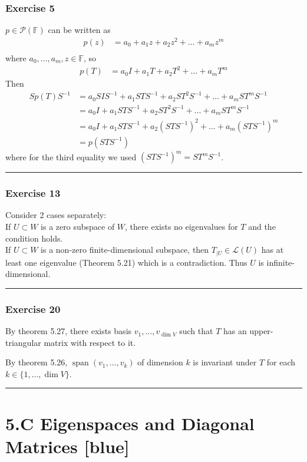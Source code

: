 \documentclass[12pt, letterpaper]{scrartcl}
\newcommand{\F}{\mathbb{F}}
\DeclareMathOperator{\Span}{span}
\begin{document}
\subsubsection*{Exercise 5}
$p\in\mathcal{P}(\F)$ can be written as
\begin{align*}
    p(z)&=a_0+a_1z+a_2z^2+\dots+a_mz^m\\
\end{align*}
where $a_0,\dots,a_m, z\in\F$, so
\begin{align*}
    p(T)&=a_0I+a_1T+a_2T^2+\dots+a_mT^m
\end{align*}
Then
\begin{align*}
    Sp(T)S^{-1}&=a_0SIS^{-1}+a_1STS^{-1}+a_2ST^2S^{-1}+\dots+a_mST^mS^{-1}\\
    &=a_0I+a_1STS^{-1}+a_2ST^2S^{-1}+\dots+a_mST^mS^{-1}\\
    &=a_0I+a_1STS^{-1}+a_2(STS^{-1})^2+\dots+a_m(STS^{-1})^m\\
    &=p(STS^{-1})
\end{align*}
where for the third equality we used $(STS^{-1})^m=ST^mS^{-1}$.
\vskip1mm\hrule


\subsubsection*{Exercise 13}
Consider 2 cases separately:\\
If $U\subset W$ is a zero subspace of $W$, there exists no eigenvalues for $T$ and the condition holds.\\
If $U\subset W$ is a non-zero finite-dimensional subspace, then $T_{|U}\in \mathcal{L}(U)$ has at least one eigenvalue (Theorem 5.21) which is a contradiction. Thus $U$ is infinite-dimensional.
\vskip1mm\hrule


\subsubsection*{Exercise 20}
By theorem 5.27, there exists basis $v_1, \dots, v_{\dim V}$ such that $T$ has an upper-triangular matrix with respect to it.

By theorem 5.26, $\Span(v_1, \dots, v_k)$ of dimension $k$ is invariant under $T$ for each $k\in\{1,\dots, {\dim V}\}$.
\vskip1mm\hrule

\clearpage
\section*{5.C Eigenspaces and Diagonal Matrices \xrfill[2pt]{3pt}[blue]}
\end{document}
